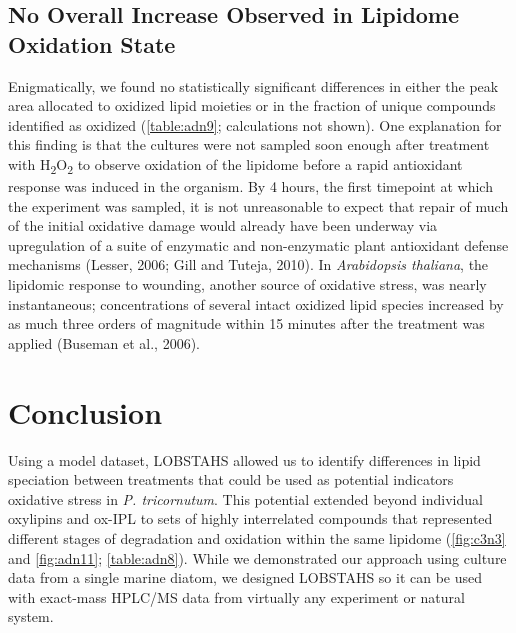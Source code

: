 \subsection{No Overall Increase Observed in Lipidome Oxidation State}

Enigmatically, we found no statistically significant differences in either the peak area allocated to oxidized lipid moieties or in the fraction of unique compounds identified as oxidized (\autoref{table:adn9}; calculations not shown). One explanation for this finding is that the cultures were not sampled soon enough after treatment with H\textsubscript{2}O\textsubscript{2} to observe oxidation of the lipidome before a rapid antioxidant response was induced in the organism. By 4 hours, the first timepoint at which the experiment was sampled, it is not unreasonable to expect that repair of much of the initial oxidative damage would already have been underway via upregulation of a suite of enzymatic and non-enzymatic plant antioxidant defense mechanisms (Lesser, 2006; Gill and Tuteja, 2010). In \emph{Arabidopsis thaliana}, the lipidomic response to wounding, another source of oxidative stress, was nearly instantaneous; concentrations of several intact oxidized lipid species increased by as much three orders of magnitude within 15 minutes after the treatment was applied (Buseman et al., 2006).

\section{Conclusion}

Using a model dataset, LOBSTAHS allowed us to identify differences in lipid speciation between treatments that could be used as potential indicators oxidative stress in \emph{P. tricornutum}. This potential extended beyond individual oxylipins and ox-IPL to sets of highly interrelated compounds that represented different stages of degradation and oxidation within the same lipidome (\autoref{fig:c3n3} and \autoref{fig:adn11}; \autoref{table:adn8}). While we demonstrated our approach using culture data from a single marine diatom, we designed LOBSTAHS so it can be used with exact-mass HPLC/MS data from virtually any experiment or natural system.

